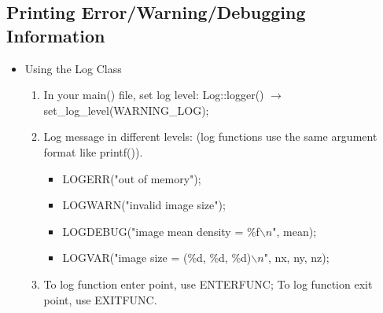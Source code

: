       \subsection{Printing Error/Warning/Debugging Information} 
	   \begin{itemize}
	    \item
	      Using the Log Class
	     \begin{enumerate}
	       \item
		 In your main() file, set log level:  Log::logger()
		 \(\longrightarrow\)set\_log\_level(WARNING\_LOG); 
	       \item
		 Log message in different levels: (log functions use the same
		 argument format like printf()).
		 \begin{itemize}
		   \item[] LOGERR("out of memory");
		   \item[] LOGWARN("invalid image size");
		   \item[] LOGDEBUG("image mean density =
		   \%f\(\backslash n\)",
		   mean);
		   \item[] LOGVAR("image size = (\%d, \%d,
		   \%d)\(\backslash n\)", nx, ny, nz);
		 \end{itemize}
	       \item
		 To log function enter point, use ENTERFUNC; To log
		 function exit point, use EXITFUNC. 
	     \end{enumerate}
	   \end{itemize} 

